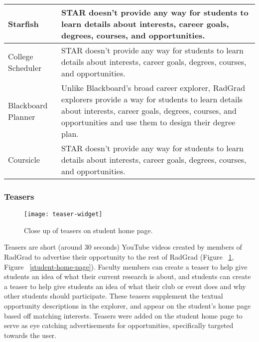 \begin{table}[htbp!]
\begin{tabular}{  |p{4cm}|p{12cm}| }
    \hline
  Starfish & STAR doesn't provide any way for students to learn details about interests, career goals, degrees, courses, and opportunities.\\
    \hline
  College Scheduler & STAR doesn't provide any way for students to learn details about interests, career goals, degrees, courses, and opportunities.\\
    \hline
  Blackboard Planner & Unlike Blackboard's broad career explorer, RadGrad explorers provide a way for students to learn details about interests, career goals, degrees, courses, and opportunities and use them to design their degree plan.\\
    \hline
  Coursicle & STAR doesn't provide any way for students to learn details about interests, career goals, degrees, courses, and opportunities.\\
  \hline
\end{tabular}
\end{table}

\subsubsection{Teasers}

\begin{figure}[htbp!]
\centering
\texttt{[image: teaser-widget]}
\caption{Close up of teasers on student home page.}
\label{teasers}
\end{figure}
Teasers are short (around 30 seconds) YouTube videos created by members of RadGrad to advertise their opportunity to the rest of RadGrad (Figure ~\ref{teasers}, Figure ~\ref{student-home-page}). Faculty members can create a teaser to help give students an idea of what their current research is about, and students can create a teaser to help give students an idea of what their club or event does and why other students should participate. These teasers supplement the textual opportunity descriptions in the explorer, and appear on the student's home page based off matching interests. Teasers were added on the student home page to serve as eye catching advertisements for opportunities, specifically targeted towards the user.

